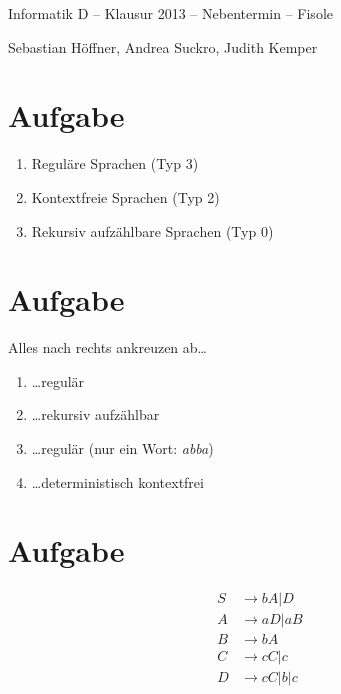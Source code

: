 \documentclass{article}
\begin{document}
\begin{center}
  \Large{Informatik D -- Klausur 2013 -- Nebentermin -- Fisole}

  \large{Sebastian Höffner, Andrea Suckro, Judith Kemper}
\end{center}

\section{Aufgabe}
\begin{enumerate}
	\item Reguläre Sprachen (Typ 3)
	\item Kontextfreie Sprachen (Typ 2)
	\item Rekursiv aufzählbare Sprachen (Typ 0)
\end{enumerate}


\section{Aufgabe}
Alles nach rechts ankreuzen ab\dots
\begin{enumerate}
	\item \dots regulär
  \item \dots rekursiv aufzählbar
  \item \dots regulär (nur ein Wort: \emph{abba})
  \item \dots deterministisch kontextfrei
\end{enumerate}

\section{Aufgabe}
\begin{align*}
S &\rightarrow bA | D\\
A &\rightarrow aD | aB\\
B &\rightarrow bA\\
C &\rightarrow cC | c\\
D &\rightarrow cC | b | c
\end{align*}
\end{document}
